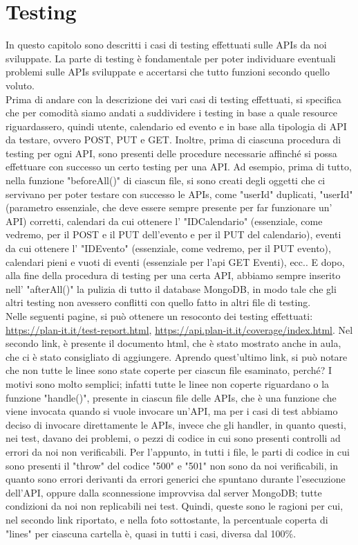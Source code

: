 \section{Testing}
\label{secD4:Testing}

In questo capitolo sono descritti i casi di testing effettuati sulle APIs da noi sviluppate. La parte di testing è fondamentale per poter individuare eventuali problemi sulle APIs sviluppate e accertarsi che tutto funzioni secondo quello voluto.\\
Prima di andare con la descrizione dei vari casi di testing effettuati, si specifica che per comodità siamo andati a suddividere i testing in base a quale resource riguardassero, quindi utente, calendario ed evento e in base alla tipologia di API da testare, ovvero POST, PUT e GET. Inoltre, prima di ciascuna procedura di testing per ogni API, sono presenti delle procedure necessarie affinché si possa effettuare con successo un certo testing per una API. Ad esempio, prima di tutto, nella funzione "beforeAll()" di ciascun file, si sono creati degli oggetti che ci servivano per poter testare con successo le APIs, come "userId" duplicati, "userId" (parametro essenziale, che deve essere sempre presente per far funzionare un' API) corretti, calendari da cui ottenere l' "IDCalendario" (essenziale, come vedremo, per il POST e il PUT dell'evento e per il PUT del calendario), eventi da cui ottenere l' "IDEvento" (essenziale, come vedremo, per il PUT evento), calendari pieni e vuoti di eventi (essenziale per l'api GET Eventi), ecc.. E dopo, alla fine della procedura di testing per una certa API, abbiamo sempre inserito nell' "afterAll()" la pulizia di tutto il database MongoDB, in modo tale che gli altri testing non avessero conflitti con quello fatto in altri file di testing. \\ Nelle seguenti pagine, si può ottenere un resoconto dei testing effettuati: \href{https://plan-it.it/test-report.html} {https://plan-it.it/test-report.html}, \href{https://api.plan-it.it/coverage/index.html} {https://api.plan-it.it/coverage/index.html}. Nel secondo link, è presente il documento html, che è stato mostrato anche in aula, che ci è stato consigliato di aggiungere. Aprendo quest'ultimo link, si può notare che non tutte le linee sono state coperte per ciascun file esaminato, perché? I motivi sono molto semplici; infatti tutte le linee non coperte riguardano o la funzione "handle()", presente in ciascun file delle APIs, che è una funzione che viene invocata quando si vuole invocare un'API, ma per i casi di test abbiamo deciso di invocare direttamente le APIs, invece che gli handler, in quanto questi, nei test, davano dei problemi, o pezzi di codice in cui sono presenti controlli ad errori da noi non verificabili. Per l'appunto, in tutti i file, le parti di codice in cui sono presenti il "throw" del codice "500" e "501" non sono da noi verificabili, in quanto sono errori derivanti da errori generici che spuntano durante l'esecuzione dell'API, oppure dalla sconnessione improvvisa dal server MongoDB; tutte condizioni da noi non replicabili nei test. Quindi, queste sono le ragioni per cui, nel secondo link riportato, e nella foto sottostante, la percentuale coperta di "lines" per ciascuna cartella è, quasi in tutti i casi, diversa dal 100\%.

